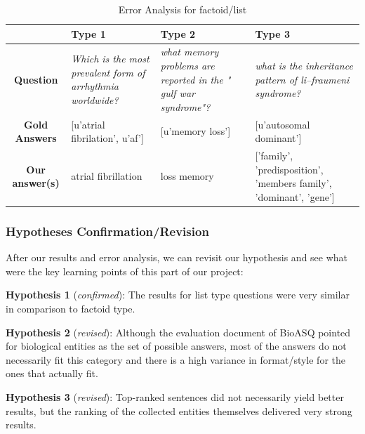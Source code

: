 \begin{table}[t]
    \centering
    \begin{tabular}{|c|p{}|p{}|p{}|} \hline
    & \textbf{Type 1} & \textbf{Type 2} & \textbf{Type 3} \\
    \hline
     \textbf{Question} & \textit{Which is the most prevalent form of arrhythmia worldwide?} & \textit{what memory problems are reported in the " gulf war syndrome"?} & \textit{what is the inheritance pattern of li–fraumeni syndrome?} \\ \hline
     \textbf{Gold Answers} &  [u'atrial fibrilation', u'af']
& [u'memory loss'] & [u'autosomal dominant'] \\
     \hline
     \textbf{Our answer(s)} & atrial fibrillation & loss memory & ['family', 'predisposition', 'members family', 'dominant', 'gene'] \\
    \hline
    \end{tabular}
    \caption{Error Analysis for factoid/list}
    \label{tab:bioasq_err_fl}
\end{table}

\subsubsection{Hypotheses Confirmation/Revision}

After our results and error analysis, we can revisit our hypothesis and see what were the key learning points of this part of our project:

\bigbreak 

\textbf{Hypothesis 1} (\textit{confirmed}): The results for list type questions were very similar in comparison to factoid type. 

\bigbreak 

\textbf{Hypothesis 2} (\textit{revised}): Although the evaluation document of BioASQ pointed for biological entities as the set of possible answers, most of the answers do not necessarily fit this category and there is  a high variance in format/style for the ones that actually fit.

\bigbreak 

\textbf{Hypothesis 3} (\textit{revised}): Top-ranked sentences did not necessarily yield better results, but the ranking of the collected entities themselves delivered very strong results.


